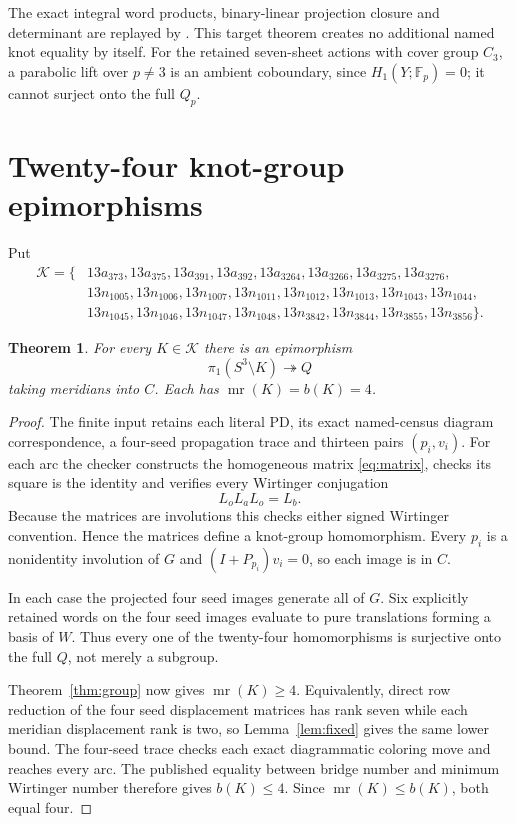 \documentclass[11pt]{article}
\newtheorem{theorem}{Theorem}
\newcommand{\F}{\mathbb F}
\newcommand{\mr}{\operatorname{mr}}
\begin{document}
The exact integral word products, binary-linear projection closure
and determinant are replayed by
. This target theorem creates
no additional named knot equality by itself. For the retained
seven-sheet actions with cover group $C_3$, a parabolic lift over
$p\ne3$ is an ambient coboundary, since $H_1(Y;\F_p)=0$; it cannot
surject onto the full $Q_p$.

\section{Twenty-four knot-group epimorphisms}

Put
\[
\begin{split}
\mathcal K=\{&
13a_{373},13a_{375},13a_{391},13a_{392},
13a_{3264},13a_{3266},13a_{3275},13a_{3276},\\
&13n_{1005},13n_{1006},13n_{1007},13n_{1011},13n_{1012},13n_{1013},
13n_{1043},13n_{1044},\\
&13n_{1045},13n_{1046},13n_{1047},13n_{1048},
13n_{3842},13n_{3844},13n_{3855},13n_{3856}\}.
\end{split}
\]

\begin{theorem}\label{thm:knots}
For every $K\in\mathcal K$ there is an epimorphism
\[
                      \pi_1(S^3\setminus K)\twoheadrightarrow Q
\]
taking meridians into $C$. Each has $\mr(K)=b(K)=4$.
\end{theorem}
\begin{proof}
The finite input retains each literal PD, its exact named-census
diagram correspondence, a four-seed propagation trace and thirteen
pairs $(p_i,v_i)$.
For each arc the checker constructs the homogeneous matrix
\eqref{eq:matrix}, checks its square is the identity and verifies
every Wirtinger conjugation
\[
                           L_oL_aL_o=L_b .
\]
Because the matrices are involutions this checks either signed
Wirtinger convention. Hence the matrices define a knot-group
homomorphism. Every $p_i$ is a nonidentity involution of $G$ and
$(I+P_{p_i})v_i=0$, so each image is in $C$.

In each case the projected four seed images generate all of $G$.
Six explicitly retained words on the four seed images evaluate to
pure translations forming a basis of $W$.
Thus every one of the twenty-four homomorphisms is surjective onto
the full $Q$, not merely a subgroup.

Theorem~\ref{thm:group} now gives $\mr(K)\ge4$.
Equivalently, direct row reduction of the four seed displacement
matrices has rank seven while each meridian displacement rank is
two, so Lemma~\ref{lem:fixed} gives the same lower bound.
The four-seed trace checks each exact diagrammatic coloring move and
reaches every arc. The published equality between bridge number and
minimum Wirtinger number \cite[Definition~1.2 and Theorem~1.3]{bkvv}
therefore gives $b(K)\le4$. Since $\mr(K)\le b(K)$, both equal four.
\end{proof}
\end{document}
